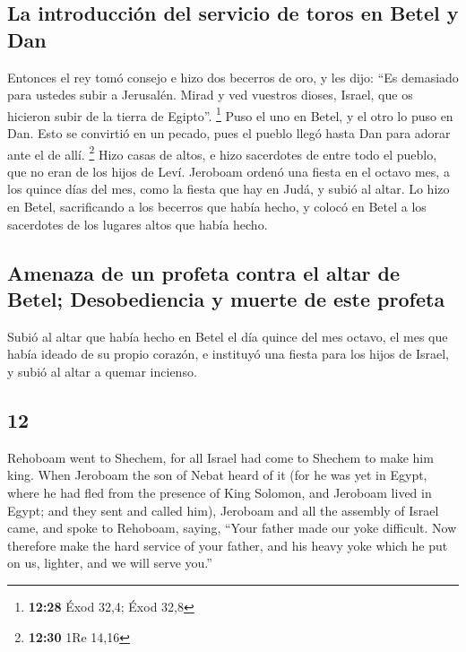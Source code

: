 \begin{paracol}{2}
\hypertarget{la-introducciuxf3n-del-servicio-de-toros-en-betel-y-dan}{%
\subsection{La introducción del servicio de toros en Betel y
Dan}\label{la-introducciuxf3n-del-servicio-de-toros-en-betel-y-dan}}

 Entonces el rey tomó consejo e hizo dos becerros de oro,
y les dijo: ``Es demasiado para ustedes subir a Jerusalén. Mirad y ved
vuestros dioses, Israel, que os hicieron subir de la tierra de Egipto''.
\footnote{\textbf{12:28} Éxod 32,4; Éxod 32,8}  Puso el
uno en Betel, y el otro lo puso en Dan.  Esto se
convirtió en un pecado, pues el pueblo llegó hasta Dan para adorar ante
el de allí. \footnote{\textbf{12:30} 1Re 14,16}  Hizo
casas de altos, e hizo sacerdotes de entre todo el pueblo, que no eran
de los hijos de Leví.  Jeroboam ordenó una fiesta en el
octavo mes, a los quince días del mes, como la fiesta que hay en Judá, y
subió al altar. Lo hizo en Betel, sacrificando a los becerros que había
hecho, y colocó en Betel a los sacerdotes de los lugares altos que había
hecho.

\hypertarget{amenaza-de-un-profeta-contra-el-altar-de-betel-desobediencia-y-muerte-de-este-profeta}{%
\subsection{Amenaza de un profeta contra el altar de Betel;
Desobediencia y muerte de este
profeta}\label{amenaza-de-un-profeta-contra-el-altar-de-betel-desobediencia-y-muerte-de-este-profeta}}

 Subió al altar que había hecho en Betel el día quince
del mes octavo, el mes que había ideado de su propio corazón, e
instituyó una fiesta para los hijos de Israel, y subió al altar a quemar
incienso.

\switchcolumn
\begin{otherlanguage}{english}

\hypertarget{section-23}{%
\section{12}\label{section-23}}

 Rehoboam went to Shechem, for all Israel had come to
Shechem to make him king.  When Jeroboam the son of Nebat
heard of it (for he was yet in Egypt, where he had fled from the
presence of King Solomon, and Jeroboam lived in Egypt; 
and they sent and called him), Jeroboam and all the assembly of Israel
came, and spoke to Rehoboam, saying,  ``Your father made
our yoke difficult. Now therefore make the hard service of your father,
and his heavy yoke which he put on us, lighter, and we will serve you.''


\end{otherlanguage}
\end{paracol}

